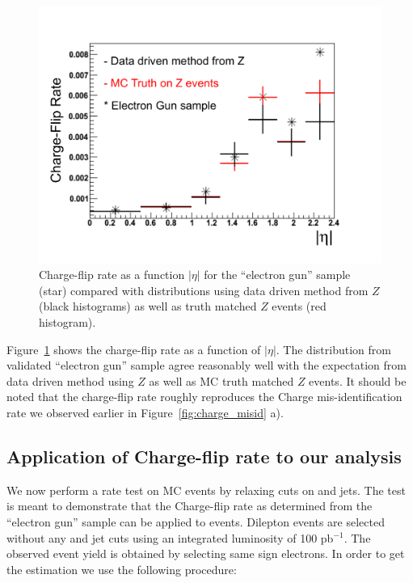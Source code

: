 \begin{figure}[htb]
\begin{center}
\includegraphics[width=0.7\linewidth]{figs/fr_rate.pdf}
\caption{Charge-flip rate as a function $|\eta|$ for the ``electron gun'' sample (star) compared with 
distributions using data driven method from $Z$ (black histograms) as well as truth matched $Z$ events 
(red histogram).\label{fig:charge_fliprate}}
\end{center}
\end{figure}

Figure~\ref{fig:charge_fliprate} shows the charge-flip rate as a function of $|\eta|$. The distribution from 
validated ``electron gun'' sample agree reasonably well with the expectation from data driven method
using $Z$ as well as MC truth matched $Z$ events. It should be noted that the charge-flip rate roughly 
reproduces the Charge mis-identification rate we observed earlier in Figure~\ref{fig:charge_misid} a).

\subsection{Application of Charge-flip rate to our analysis}

We now perform a rate test on \ttbar MC events by relaxing cuts on \met and jets. The test is meant
to demonstrate that the Charge-flip rate as determined from the ``electron gun'' sample can be applied
to \ttbar events. Dilepton events are selected without any \met and jet cuts using an integrated 
luminosity of 100 pb$^{-1}$. The observed event yield is obtained by selecting same sign electrons.
In order to get the estimation we use the following procedure:

